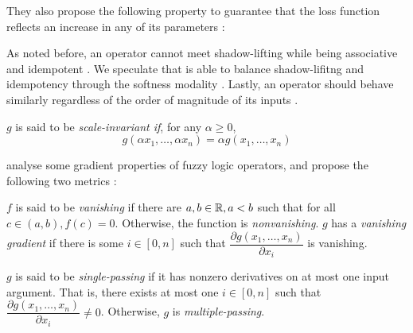 They also propose the following property to guarantee that the loss function reflects an increase in any of its parameters \citep{varnai2020robustness}:


As noted before, an operator cannot meet shadow-lifting while being associative and idempotent \citep{varnai2020robustness}. We speculate that \citeauthor{capucci2024quantifiers} is able to balance shadow-lifitng and idempotency through the softness modality \citep{capucci2024quantifiers}. Lastly, an operator should behave similarly regardless of the order of magnitude of its inputs \citep{varnai2020robustness}.

\begin{definition}
    $g$ is said to be \textit{scale-invariant if}, for any $\alpha \geq 0$, 
    \begin{equation}
    g(\alpha x_1,\dots,\alpha x_n) = \alpha g(x_1,\dots,x_n)    
    \end{equation}
\end{definition}

\citeauthor{van2022analyzing} analyse some gradient properties of fuzzy logic operators, and propose the following two metrics \citep{van2022analyzing}:

\begin{definition}[Vanishing]
    $f$ is said to be \textit{vanishing} if there are $a,b \in \mathbb{R}, a < b$ such that for all $c \in (a,b), f(c) = 0$. Otherwise, the function is \textit{nonvanishing}. $g$ has a \textit{vanishing gradient} if there is some $i \in [0,n]$ such that $\dfrac{\partial g(x_1,\dots,x_n)}{\partial x_i}$ is vanishing.
\end{definition}

\begin{definition}
    $g$ is said to be \textit{single-passing} if  it has nonzero derivatives on at most one input argument. That is, there exists at most one $i \in [0,n]$ such that $\dfrac{\partial g(x_1,\dots,x_n)}{\partial x_i} \neq 0$. Otherwise, $g$ is \textit{multiple-passing}.
\end{definition}

